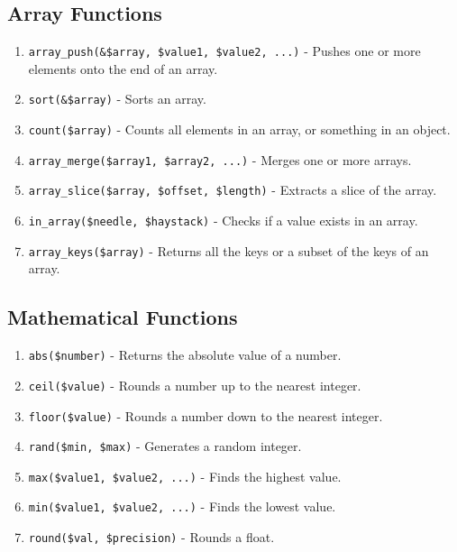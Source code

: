 \documentclass[11pt]{article}
\begin{document}
\subsection{Array Functions}
\label{sec:org2fdcfbe}
\begin{enumerate}
\item \texttt{array\_push(\&\$array, \$value1, \$value2, ...)} - Pushes one or more
elements onto the end of an array.
\item \texttt{sort(\&\$array)} - Sorts an array.
\item \texttt{count(\$array)} - Counts all elements in an array, or something in an
object.
\item \texttt{array\_merge(\$array1, \$array2, ...)} - Merges one or more arrays.
\item \texttt{array\_slice(\$array, \$offset, \$length)} - Extracts a slice of the
array.
\item \texttt{in\_array(\$needle, \$haystack)} - Checks if a value exists in an
array.
\item \texttt{array\_keys(\$array)} - Returns all the keys or a subset of the keys
of an array.
\end{enumerate}

\subsection{Mathematical Functions}
\label{sec:org756a3e7}
\begin{enumerate}
\item \texttt{abs(\$number)} - Returns the absolute value of a number.
\item \texttt{ceil(\$value)} - Rounds a number up to the nearest integer.
\item \texttt{floor(\$value)} - Rounds a number down to the nearest integer.
\item \texttt{rand(\$min, \$max)} - Generates a random integer.
\item \texttt{max(\$value1, \$value2, ...)} - Finds the highest value.
\item \texttt{min(\$value1, \$value2, ...)} - Finds the lowest value.
\item \texttt{round(\$val, \$precision)} - Rounds a float.
\end{enumerate}
\end{document}
